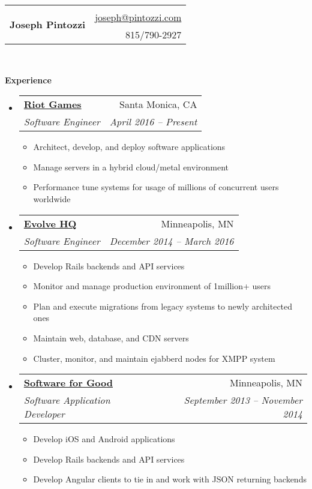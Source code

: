 \documentclass[letterpaper,12pt]{article}
\makeatletter
\newcommand{\resitem}[1]{\item #1 \vspace{-2pt}}
\newcommand{\resheading}[1]{{\large \colorbox{mygrey}{\begin{minipage}{\textwidth}{\textbf{#1 \vphantom{p\^{E}}}}\end{minipage}}}}
\newcommand{\ressubheading}[4]{
      \begin{tabular*}{6.5in}{l@{\extracolsep{\fill}}r}
        \textbf{#1} & #2 \\
        \textit{#3} & \textit{#4} \\
      \end{tabular*}\vspace{-6pt}}
\makeatother
\begin{document}
\newcommand{\mywebheader}{
  \begin{tabular*}{7in}{l@{\extracolsep{\fill}}r}
    \multirow{4}{*}{\huge \bf Joseph Pintozzi} \\
                            & \href{mailto:joseph@pintozzi.com}{joseph@pintozzi.com}\\
                            & {815/790-2927}
  \end{tabular*}
\\
\vspace{0.1in}
}

\mywebheader

\resheading{Experience}
  \begin{itemize}
    \item
      \ressubheading{\href{http://riotgames.com}{Riot Games}}{Santa Monica, CA}{Software Engineer}{April 2016 -- Present}
        { \footnotesize
        \begin{itemize}
            \resitem{Architect, develop, and deploy software applications}
            \resitem{Manage servers in a hybrid cloud/metal environment}
            \resitem{Performance tune systems for usage of millions of concurrent users worldwide}
        \end{itemize}
         }
       \item
         \ressubheading{\href{http://evolvehq.com/}{Evolve HQ}}{Minneapolis, MN}{Software Engineer}{December 2014 -- March 2016}
        { \footnotesize
        \begin{itemize}
            \resitem{Develop Rails backends and API services}
            \resitem{Monitor and manage production environment of 1million+ users}
            \resitem{Plan and execute migrations from legacy systems to newly architected ones}
            \resitem{Maintain web, database, and CDN servers}
            \resitem{Cluster, monitor, and maintain ejabberd nodes for XMPP system}
        \end{itemize}
         }
       \item
         \ressubheading{\href{http://softwareforgood.com/}{Software for Good}}{Minneapolis, MN}{Software Application Developer}{September 2013 -- November 2014}
        { \footnotesize
        \begin{itemize}
            \resitem{Develop iOS and Android applications}
            \resitem{Develop Rails backends and API services}
            \resitem{Develop Angular clients to tie in and work with JSON returning backends}

\end{itemize}}
\end{itemize}
\end{document}
